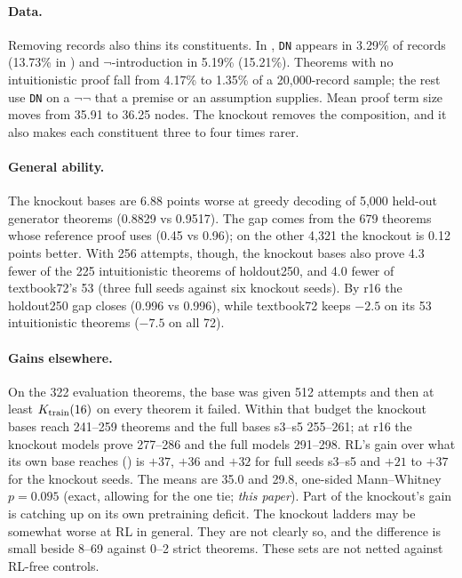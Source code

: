 \paragraph{Data.} Removing \sigp{} records also thins its constituents. In \KTko{}, \texttt{DN} appears in 3.29\% of
records (13.73\% in \KT{}) and $\neg$-introduction in 5.19\% (15.21\%). Theorems with no intuitionistic proof fall from
4.17\% to 1.35\% of a 20,000-record sample; the rest use \texttt{DN} on a $\neg\neg$ that a premise or an assumption
supplies. Mean proof term size moves from 35.91 to 36.25 nodes. The knockout removes the composition, and it also makes
each constituent three to four times rarer.

\paragraph{General ability.} The knockout bases are 6.88 points worse at greedy decoding of 5,000 held-out generator
theorems (0.8829 vs 0.9517). The gap comes from the 679 theorems whose reference proof uses \sig{} (0.45 vs 0.96); on
the other 4,321 the knockout is 0.12 points better. With 256 attempts, though, the knockout bases also prove 4.3 fewer
of the 225 intuitionistic theorems of holdout250, and 4.0 fewer of textbook72's 53 (three full seeds against six
knockout seeds). By r16 the holdout250 gap closes (0.996 vs 0.996), while textbook72 keeps $-2.5$ \rv{} on its 53 intuitionistic theorems ($-7.5$ on all 72).

\paragraph{Gains elsewhere.} On the 322 evaluation theorems, the base was given 512 attempts and then at least
$K_{\mathrm{train}}(16)$ on every theorem it failed. Within that budget the knockout bases reach 241--259 theorems and the full bases s3--s5
255--261; at r16 the knockout models prove 277--286 and the full models 291--298. RL's gain over what its own base reaches
(\dcov{}) is $+37$, $+36$ and $+32$ for full seeds s3--s5 and $+21$ to $+37$ for the knockout seeds. The means are 35.0
and 29.8, one-sided Mann--Whitney \rv{} $p = 0.095$ (exact, allowing for the one tie; \emph{this paper}). Part of the knockout's gain is
catching up on its own pretraining deficit. The knockout ladders may be somewhat worse at RL in general. They are not
clearly so, and the difference is small beside 8--69 against 0--2 strict theorems. These sets are not netted against
RL-free controls.


